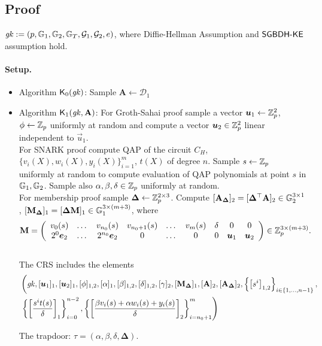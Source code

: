 \subsection{Proof}


$\mathit{gk}  := (p,\mathbb{G}_1,\mathbb{G}_2,\mathbb{G}_T,\mathcal{G}_1,\mathcal{G}_2,e)$, where Diffie-Hellman Assumption and $\mathsf{SGBDH\mbox{-}KE}$ assumption hold.

\paragraph{Setup.} \begin{itemize}
	\item Algorithm $\mathsf{K}_0(\mathit{gk})$: Sample $\mathbf{A} \gets \mathcal{D}_1$ \\
	\item Algorithm $\mathsf{K}_1(\mathit{gk},\mathbf{A} )$: For Groth-Sahai proof sample a vector $\vec{u}_1 \gets \Z_p^2$, $\phi\gets \mathbb{Z}_p$ uniformly at random and compute a vector $\vec{u}_2\in \Z_p^2$ linear independent to $\vec{u}_1$.\\
	For SNARK proof compute QAP of the circuit $C_H$, $\{v_i(X), w_i(X), y_i(X)\}_{i=1}^m$, $t(X)$ of degree $n$. Sample $s \gets \mathbb{Z}_p$ uniformly at random to compute evaluation of QAP polynomials at point $s$ in $\mathbb{G}_1, \mathbb{G}_2$. Sample also $\alpha, \beta,  \delta \in \mathbb{Z}_p$ uniformly at random.\\
	For membership proof sample
	$\mathbf{\Delta}\gets \mathbb{Z}_p^{2\times 3}$. Compute $[\mathbf{A}_{\mathbf{\Delta}}]_2=[\mathbf{\Delta}^{\top}\mathbf{A}]_2 \in \mathbb{G}_2^{3\times 1}$, $[\mathbf{M}_{\mathbf{\Delta}}]_1=[\mathbf{\Delta}\mathbf{M}]_1 \in \mathbb{G}_1^{3\times (m+3)}$, 
	where 
	$$\mathbf{M}=\left(\begin{array}{c c c c c c c c c}
	v_0(s) & \dots & v_{n_0}(s) & v_{n_0+1}(s) & \dots & v_{m}(s) &\delta & 0 & 0 \\
	2^0\vec{e}_2 & \dots & 2^{n_0} \vec{e}_2 & 0 &\dots &0 & 0 & \vec{u}_1 & \vec{u}_2\\
	\end{array}\right) \in \Z_p^{3\times (m+3)}.$$\\
	The CRS includes the elements 	
	\[\begin{split}
	&\left(\gk,[\vec{u}_1]_1,[\vec{u}_2]_1,[\phi]_{1,2},[\alpha]_{1},[\beta]_{1,2},[\delta]_{1,2},[\gamma]_2,[\mathbf{M}_{\mathbf{\Delta}}]_1,[\mathbf{A}]_2,[\mathbf{A}_{\mathbf{\Delta}}]_2,\left\{\left[s^{i}\right]_{1,2}\right\}_{i\in\{1,\dots,n-1\}},\right.\\
	&\left.
	\left\{\left[\frac{s^i t(s)}{\delta}\right]_1\right\}_{i=0}^{n-2},
	\left\{\left[\frac{\beta v_i(s)+\alpha w_i(s) +y_i(s)}{\delta}\right]_2\right\}_{i=n_0+1}^{m}\right)
	\end{split}\]
	
	The trapdoor: $\tau = (%
	\alpha, \beta,\delta, \mathbf{\Delta})$.
\end{itemize} 


